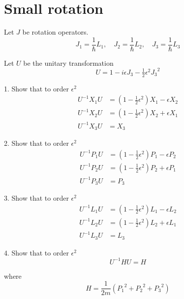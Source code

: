 

\section*{Small rotation}

Let $J$ be rotation operators.
\begin{equation*}
J_1=\frac{1}{\hbar}L_1,\quad
J_2=\frac{1}{\hbar}L_2,\quad
J_3=\frac{1}{\hbar}L_3
\end{equation*}

Let $U$ be the unitary transformation
\begin{equation*}
U=1-i\epsilon J_3-\tfrac{1}{2}\epsilon^2{J_3}^2
\end{equation*}

1. Show that to order $\epsilon^2$
\begin{align*}
U^{-1}X_1U&=\left(1-\tfrac{1}{2}\epsilon^2\right)X_1-\epsilon X_2
\\
U^{-1}X_2U&=\left(1-\tfrac{1}{2}\epsilon^2\right)X_2+\epsilon X_1
\\
U^{-1}X_3U&=X_3
\end{align*}

2. Show that to order $\epsilon^2$
\begin{align*}
U^{-1}P_1U&=\left(1-\tfrac{1}{2}\epsilon^2\right)P_1-\epsilon P_2
\\
U^{-1}P_2U&=\left(1-\tfrac{1}{2}\epsilon^2\right)P_2+\epsilon P_1
\\
U^{-1}P_3U&=P_3
\end{align*}

3. Show that to order $\epsilon^2$
\begin{align*}
U^{-1}L_1U&=\left(1-\tfrac{1}{2}\epsilon^2\right)L_1-\epsilon L_2
\\
U^{-1}L_2U&=\left(1-\tfrac{1}{2}\epsilon^2\right)L_2+\epsilon L_1
\\
U^{-1}L_3U&=L_3
\end{align*}

4. Show that to order $\epsilon^2$
\begin{equation*}
U^{-1}HU=H
\end{equation*}

where
\begin{equation*}
H=\frac{1}{2m}\left({P_1}^2+{P_2}^2+{P_3}^2\right)
\end{equation*}


